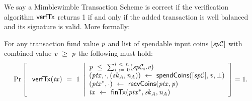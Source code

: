 We say a Mimblewimble Transaction Scheme is correct if the verification algorithm $\mathsf{verfTx}$ returns 1 if and only if the added transaction is well balanced and its signature is valid.
More formally:
\begin{definition}
    \label{def:atom:tx-scheme-correctness}
    For any transaction fund value $\mathit{p}$ and list of spendable input coins $[\mathit{sp}\mathcal{C}]$ with combined value $\mathit{v} ~\geq~ \mathit{p}$ the following must hold:
    \[
        \Pr\left[
        \begin{array}{c}
            \: \mathsf{verfTx}(\mathit{tx}) ~=~ 1
        \end{array}
        \middle\vert
        \begin{array}{l}
            \mathit{p} ~\leq~ \sum_{\mathit{i} ~:=~ 0}^{\mathit{i} ~<~ \mathit{n}}(\mathit{sp}\mathcal{C}_{i}.\mathit{v}) \\
            (\mathit{ptx}, \cdot, (\mathit{sk}_{\mathit{A}}, \mathit{\mathit{n}_{\mathit{A}}})) ~\leftarrow~ \mathsf{spendCoins}([\mathit{sp}\mathcal{C}],\mathit{v},\bot) \\
            (\mathit{ptx}^*, \cdot) ~\leftarrow~ \mathsf{recvCoins}(\mathit{ptx},\mathit{p}) \\
            \mathit{tx} ~\leftarrow~ \mathsf{finTx}(\mathit{ptx}^*,\mathit{sk}_{\mathit{A}},\mathit{\mathit{n}_{\mathit{A}}})
        \end{array}
        \right]=1.
    \]
\end{definition}


